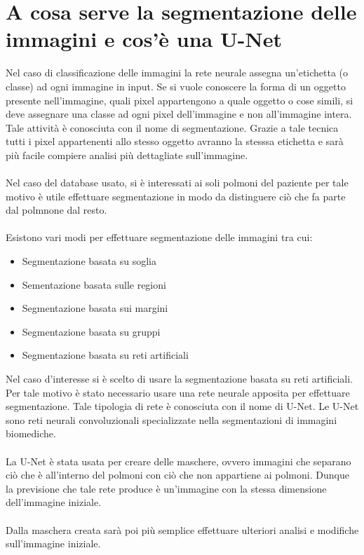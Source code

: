 \section{A cosa serve la segmentazione delle immagini e cos'è una U-Net}
Nel caso di classificazione delle immagini la rete neurale assegna un'etichetta (o classe) ad ogni 
immagine in input. Se si vuole conoscere la forma di un oggetto presente nell'immagine, quali pixel appartengono
a quale oggetto o cose simili, si deve assegnare una classe ad ogni pixel dell'immagine e non all'immagine intera.
Tale attività è conosciuta con il nome di segmentazione. 
Grazie a tale tecnica tutti i pixel appartenenti allo stesso oggetto avranno la stesssa etichetta e
sarà più facile compiere analisi più dettagliate sull'immagine.
\\\\
Nel caso del database usato, si è interessati ai soli polmoni del paziente per tale motivo è utile 
effettuare segmentazione in modo da distinguere ciò che fa parte dal polmnone dal resto.
\\\\
Esistono vari modi per effettuare segmentazione delle immagini tra cui:
\begin{itemize}
    \item Segmentazione basata su soglia
    \item Sementazione basata sulle regioni
    \item Segmentazione basata sui margini
    \item Segmentazione basata su gruppi
    \item Segmentazione basata su reti artificiali
\end{itemize}
Nel caso d'interesse si è scelto di usare la segmentazione basata su reti artificiali.
Per tale motivo è stato necessario usare una rete neurale apposita per effettuare segmentazione.
Tale tipologia di rete è conosciuta con il nome di U-Net. Le U-Net sono reti neurali convoluzionali specializzate
nella segmentazioni di immagini biomediche.
\\\\
La U-Net è stata usata per creare delle maschere, ovvero immagini che separano ciò che è all'interno del polmoni 
con ciò che non appartiene ai polmoni. Dunque la previsione che tale rete produce è un'immagine con la 
stessa dimensione dell'immagine iniziale.
\\\\
Dalla maschera creata sarà poi più semplice effettuare ulteriori analisi e modifiche 
sull'immagine iniziale.
\pagebreak
